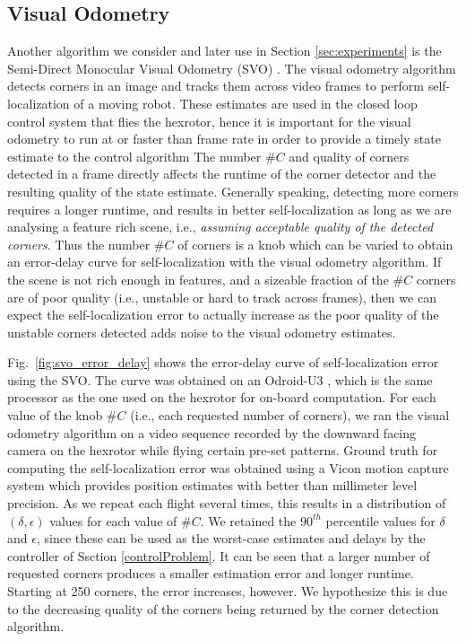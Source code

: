 \subsection{Visual Odometry} \label{sec:visual_odometry}

Another algorithm we consider and later use in Section  \ref{sec:experiments} is the Semi-Direct Monocular Visual Odometry (SVO) \cite{forster2014svo}.
The visual odometry algorithm detects corners in an image and tracks them across video frames to perform self-localization of a moving robot.
These estimates are used in the closed loop control system that flies the hexrotor, hence it is important for the visual odometry to run at or faster than frame rate in order to provide a timely state estimate to the control algorithm
The number $\#C$ and quality of corners detected in a frame directly affects the runtime of the corner detector and the resulting quality of the state estimate. Generally speaking, detecting more corners requires a longer runtime, and results in better self-localization as long as we are analysing a feature rich scene, i.e., \emph{assuming acceptable quality of the detected corners}. Thus the number $\#C$ of corners is a knob which can be varied to obtain an error-delay curve for self-localization with the visual odometry algorithm.
If the scene is not rich enough in features, and a sizeable fraction of the $\#C$ corners are of poor quality (i.e., unstable or hard to track across frames), then we can expect the self-localization error to actually increase as the poor quality of the unstable corners detected adds noise to the visual odometry estimates.

Fig.~\ref{fig:svo_error_delay} shows the error-delay curve of self-localization error using the SVO. The curve was obtained on an Odroid-U3 \cite{Odroid}, which is the same processor as the one used on the hexrotor for on-board computation.
For each value of the knob $\#C$ (i.e., each requested number of corners), we ran the visual odometry algorithm on a video sequence recorded by the downward facing camera on the hexrotor while flying certain pre-set patterns.
Ground truth for computing the self-localization error was obtained using a Vicon motion capture system which provides position estimates with better than millimeter level precision.
As we repeat each flight several times, this results in a distribution of $(\delta,\epsilon)$ values for each value of $\#C$.
We retained the $90^{th}$ percentile values for $\delta$ and $\epsilon$, since these can be used as the worst-case estimates and delays by the controller of Ssction \ref{controlProblem}.
It can be seen that a larger number of requested corners produces a smaller estimation error and longer runtime.
Starting at 250 corners, the error increases, however.
We hypothesize this is due to the decreasing quality of the corners being returned by the corner detection algorithm. 

